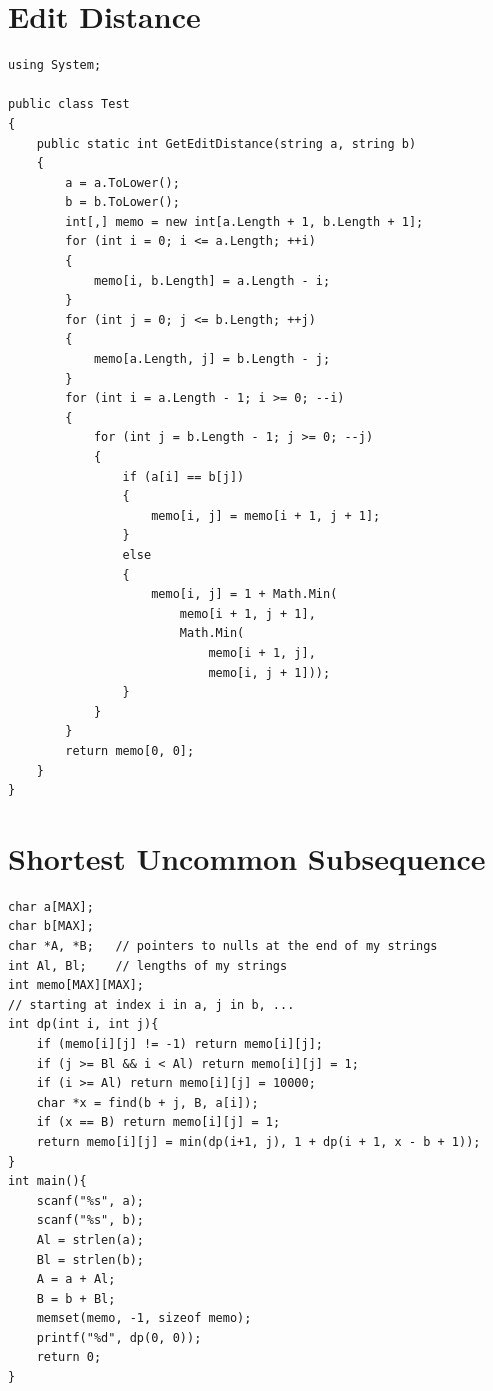 \documentclass[12pt]{book}
\begin{document}
\section{Edit Distance}
\begin{verbatim}
using System;

public class Test
{
	public static int GetEditDistance(string a, string b)
	{
		a = a.ToLower();
		b = b.ToLower();
		int[,] memo = new int[a.Length + 1, b.Length + 1];
		for (int i = 0; i <= a.Length; ++i)
		{
			memo[i, b.Length] = a.Length - i;
		}
		for (int j = 0; j <= b.Length; ++j)
		{
			memo[a.Length, j] = b.Length - j;
		}
		for (int i = a.Length - 1; i >= 0; --i)
		{
			for (int j = b.Length - 1; j >= 0; --j)
			{
				if (a[i] == b[j])
				{
					memo[i, j] = memo[i + 1, j + 1];
				}
				else
				{
					memo[i, j] = 1 + Math.Min(
						memo[i + 1, j + 1],
						Math.Min(
							memo[i + 1, j],
							memo[i, j + 1]));
				}
			}
		}
		return memo[0, 0];
	}
}
\end{verbatim}
\section{Shortest Uncommon Subsequence}
\begin{verbatim}
char a[MAX];
char b[MAX];
char *A, *B;   // pointers to nulls at the end of my strings
int Al, Bl;    // lengths of my strings
int memo[MAX][MAX];
// starting at index i in a, j in b, ...
int dp(int i, int j){
	if (memo[i][j] != -1) return memo[i][j];
	if (j >= Bl && i < Al) return memo[i][j] = 1;
	if (i >= Al) return memo[i][j] = 10000;
	char *x = find(b + j, B, a[i]);
	if (x == B) return memo[i][j] = 1;
	return memo[i][j] = min(dp(i+1, j), 1 + dp(i + 1, x - b + 1));
}
int main(){
	scanf("%s", a);
	scanf("%s", b);
	Al = strlen(a);
	Bl = strlen(b);
	A = a + Al;
	B = b + Bl;
	memset(memo, -1, sizeof memo);
	printf("%d", dp(0, 0));
	return 0;
}
\end{verbatim}
\end{document}
